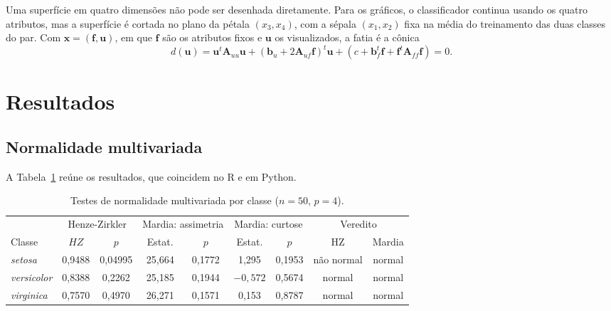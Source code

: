 \documentclass[12pt,a4paper]{article}
\newcommand{\setosa}{\emph{setosa}}
\newcommand{\versicolor}{\emph{versicolor}}
\newcommand{\virginica}{\emph{virginica}}
\begin{document}
Uma superfície em quatro dimensões não pode ser desenhada diretamente. Para os gráficos, o classificador continua usando os quatro atributos, mas a superfície é cortada no plano da pétala $(x_3, x_4)$, com a sépala $(x_1, x_2)$ fixa na média do treinamento das duas classes do par. Com $\mathbf{x} = (\mathbf{f}, \mathbf{u})$, em que $\mathbf{f}$ são os atributos fixos e $\mathbf{u}$ os visualizados, a fatia é a cônica
\begin{equation}
  d(\mathbf{u}) = \mathbf{u}^t\mathbf{A}_{uu}\mathbf{u} + (\mathbf{b}_u + 2\mathbf{A}_{uf}\mathbf{f})^t\mathbf{u} + (c + \mathbf{b}_f^t\mathbf{f} + \mathbf{f}^t\mathbf{A}_{ff}\mathbf{f}) = 0.
  \label{eq:fatia}
\end{equation}

\section{Resultados}\label{sec:resultados}

\subsection{Normalidade multivariada}

A Tabela~\ref{tab:normalidade} reúne os resultados, que coincidem no R e em Python.

\begin{table}[H]
\centering
\caption{Testes de normalidade multivariada por classe ($n = 50$, $p = 4$).}
\label{tab:normalidade}
\small
\begin{tabular}{lcccccccc}
\toprule
 & \multicolumn{2}{c}{Henze-Zirkler} & \multicolumn{2}{c}{Mardia: assimetria} & \multicolumn{2}{c}{Mardia: curtose} & \multicolumn{2}{c}{Veredito} \\
\cmidrule(lr){2-3}\cmidrule(lr){4-5}\cmidrule(lr){6-7}\cmidrule(lr){8-9}
Classe & $HZ$ & $p$ & Estat. & $p$ & Estat. & $p$ & HZ & Mardia \\
\midrule
\setosa{}     & 0,9488 & 0,04995 & 25,664 & 0,1772 & 1,295     & 0,1953 & não normal & normal \\
\versicolor{} & 0,8388 & 0,2262  & 25,185 & 0,1944 & $-0{,}572$ & 0,5674 & normal & normal \\
\virginica{}  & 0,7570 & 0,4970  & 26,271 & 0,1571 & 0,153     & 0,8787 & normal & normal \\
\bottomrule
\end{tabular}
\end{table}
\end{document}
